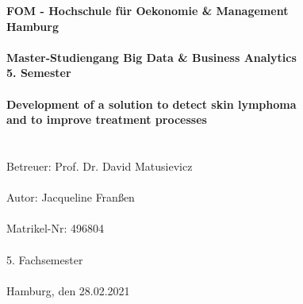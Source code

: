 		\begin{titlepage}
			\begin{center}
			\renewcommand{\baselinestretch}{1.5}
					\textbf{\large FOM - Hochschule für Oekonomie \& Management \\
						Hamburg \\
						\ \\
						Master-Studiengang Big Data \& Business Analytics \\
						5. Semester \\
						\ \\
						Development of a solution to detect skin lymphoma  \\
						and to improve treatment processes} \ \\
						\ \\
						
						
					\textrm{
						\ \\
						Betreuer: Prof. Dr. David Matusievicz \\
						\ \\
						Autor: Jacqueline Franßen \\
						\ \\
						Matrikel-Nr: 496804 \\
						\ \\
						5. Fachsemester \\
						\ \\
						Hamburg, den 28.02.2021 \\
						}
			\end{center}
		\end{titlepage}

%

			\setcounter{tocdepth}{3}
			\setcounter{secnumdepth}{3}		
			\thispagestyle{empty}
			\tableofcontents
			\newpage
			\listoffigures
			\listoftables

			\thispagestyle{empty}